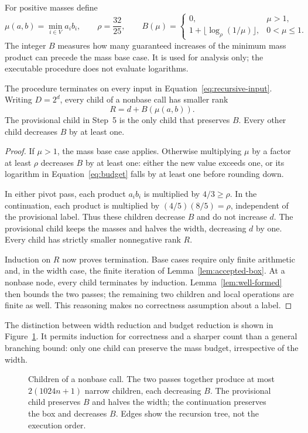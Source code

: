 For positive masses define
\begin{equation}
 \mu(a,b)=\min_{i\in V}a_i b_i,
 \qquad \rho=\frac{32}{25},
 \qquad
 B(\mu)=
 \begin{cases}
  0,&\mu>1,\\
  1+\lfloor\log_{\rho}(1/\mu)\rfloor,&0<\mu\le1.
 \end{cases}
 \label{eq:budget}
\end{equation}
The integer $B$ measures how many guaranteed increases of the
minimum mass product can precede the mass base case. It is used for
analysis only; the executable procedure does not evaluate logarithms.

\begin{lemma}
\label{lem:termination}
The procedure terminates on every input in
Equation~\eqref{eq:recursive-input}. Writing $D=2^d$, every
child of a nonbase call has smaller rank
\[
                            R=d+B(\mu(a,b)).
\]
The provisional child in Step~5 is the only child that preserves $B$.
Every other child decreases $B$ by at least one.
\end{lemma}

\begin{proof}
If $\mu>1$, the mass base case applies. Otherwise multiplying
$\mu$ by a factor at least $\rho$ decreases $B$ by at least
one: either the new value exceeds one, or its logarithm in
Equation~\eqref{eq:budget} falls by at least one before rounding
down.

In either pivot pass, each product $a_i b_i$ is multiplied by
$4/3\ge\rho$. In the continuation, each product is multiplied by
$(4/5)(8/5)=\rho$, independent of the provisional label. Thus
these children decrease $B$ and do not increase $d$. The
provisional child keeps the masses and halves the width, decreasing
$d$ by one. Every child has strictly smaller nonnegative rank $R$.

Induction on $R$ now proves termination. Base cases require only
finite arithmetic and, in the width case, the finite iteration of
Lemma~\ref{lem:accepted-box}. At a nonbase node, every child
terminates by induction. Lemma~\ref{lem:well-formed} then bounds
the two passes; the remaining two children and local operations are
finite as well. This reasoning makes no correctness assumption about
a label.
\end{proof}

The distinction between width reduction and budget reduction is shown
in Figure~\ref{fig:recursion}. It permits induction for correctness
and a sharper count than a general branching bound: only one child
can preserve the mass budget, irrespective of the width.

\begin{figure}[htbp]
 \centering
 
 \caption{Children of a nonbase call. The two passes together produce
 at most $2(1024n+1)$ narrow children, each decreasing $B$.
 The provisional child preserves $B$ and halves the width; the
 continuation preserves the box and decreases $B$. Edges show the
 recursion tree, not the execution order.}
 \label{fig:recursion}
\end{figure}
